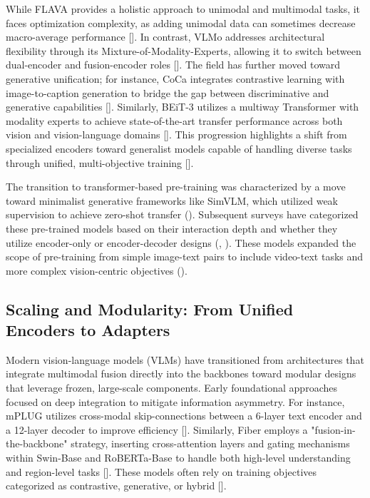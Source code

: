\documentclass[11pt]{article}
\begin{document}
While FLAVA provides a holistic approach to unimodal and multimodal tasks, it faces optimization complexity, as adding unimodal data can sometimes decrease macro-average performance [\citep{2112.04482}]. In contrast, VLMo addresses architectural flexibility through its Mixture-of-Modality-Experts, allowing it to switch between dual-encoder and fusion-encoder roles [\citep{2111.02358}]. The field has further moved toward generative unification; for instance, CoCa integrates contrastive learning with image-to-caption generation to bridge the gap between discriminative and generative capabilities [\citep{2205.01917}]. Similarly, BEiT-3 utilizes a multiway Transformer with modality experts to achieve state-of-the-art transfer performance across both vision and vision-language domains [\citep{2208.10442}]. This progression highlights a shift from specialized encoders toward generalist models capable of handling diverse tasks through unified, multi-objective training [\citep{2211.09808}].

The transition to transformer-based pre-training was characterized by a move toward minimalist generative frameworks like SimVLM, which utilized weak supervision to achieve zero-shot transfer (\citep{2108.10904}). Subsequent surveys have categorized these pre-trained models based on their interaction depth and whether they utilize encoder-only or encoder-decoder designs (\citep{2307.03254}, \citep{2202.09061}). These models expanded the scope of pre-training from simple image-text pairs to include video-text tasks and more complex vision-centric objectives (\citep{2210.09263}).
\subsection{Scaling and Modularity: From Unified Encoders to Adapters}

Modern vision-language models (VLMs) have transitioned from architectures that integrate multimodal fusion directly into the backbones toward modular designs that leverage frozen, large-scale components. Early foundational approaches focused on deep integration to mitigate information asymmetry. For instance, mPLUG utilizes cross-modal skip-connections between a 6-layer text encoder and a 12-layer decoder to improve efficiency [\citep{2205.12005}]. Similarly, Fiber employs a "fusion-in-the-backbone" strategy, inserting cross-attention layers and gating mechanisms within Swin-Base and RoBERTa-Base to handle both high-level understanding and region-level tasks [\citep{2206.07643}]. These models often rely on training objectives categorized as contrastive, generative, or hybrid [\citep{2307.13721}].
\end{document}
